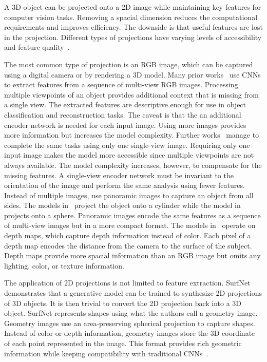 A 3D object can be projected onto a 2D image while maintaining key features for computer vision tasks. Removing a spacial dimension reduces the computational requirements and improves efficiency. The downside is that useful features are lost in the projection. Different types of projections have varying levels of accessibility and feature quality~\cite{Ahmed2018}.

The most common type of projection is an RGB image, which can be captured using a digital camera or by rendering a 3D model. Many prior works~\cite{Zhu2014, Su2015, Choy2016, Smith2018} use CNNs to extract features from a sequence of multi-view RGB images. Processing multiple viewpoints of an object provides additional context that is missing from a single view. The extracted features are descriptive enough for use in object classification and reconstruction tasks. The caveat is that the an additional encoder network is needed for each input image. Using more images provides more information but increases the model complexity. Further works~\cite{Fan2017, Wang2018, Niu2018, Genova2020, Pan2019} manage to complete the same tasks using only one single-view image. Requiring only one input image makes the model more accessible since multiple viewpoints are not always available. The model complexity increases, however, to compensate for the missing features. A single-view encoder network must be invariant to the orientation of the image and perform the same analysis using fewer features. Instead of multiple images, \cite{Shi2015, Sfikas2017, Cao2017} use panoramic images to capture an object from all sides. The models in~\cite{Shi2015, Sfikas2017} project the object onto a cylinder while the model in~\cite{Cao2017} projects onto a sphere. Panoramic images encode the same features as a sequence of multi-view images but in a more compact format. The models in~\cite{Zhu2014, Genova2020, Shi2015, Sfikas2017, Cao2017} operate on depth maps, which capture depth information instead of color. Each pixel of a depth map encodes the distance from the camera to the surface of the subject. Depth maps provide more spacial information than an RGB image but omits any lighting, color, or texture information.

The application of 2D projections is not limited to feature extraction. SurfNet~\cite{Sinha2017} demonstrates that a generative model can be trained to synthesize 2D projections of 3D objects. It is then trivial to convert the 2D projection back into a 3D object. SurfNet represents shapes using what the authors call a geometry image. Geometry images use an area-preserving spherical projection to capture shapes. Instead of color or depth information, geometry images store the 3D coordinate of each point represented in the image. This format provides rich geometric information while keeping compatibility with traditional CNNs~\cite{Sinha2017}.

